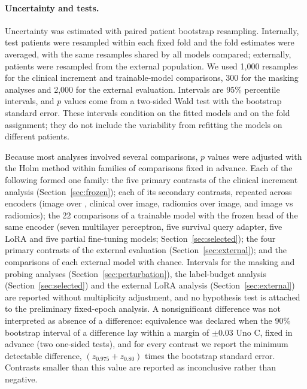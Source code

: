 \paragraph{Uncertainty and tests.} Uncertainty was estimated with paired patient bootstrap resampling. Internally, test patients were resampled within each fixed fold and the fold estimates were averaged, with the same resamples shared by all models compared; externally, patients were resampled from the external population. We used 1,000 resamples for the clinical increment and trainable-model comparisons, 300 for the masking analyses and 2,000 for the external evaluation. Intervals are 95\% percentile intervals, and $p$ values come from a two-sided Wald test with the bootstrap standard error. These intervals condition on the fitted models and on the fold assignment; they do not include the variability from refitting the models on different patients.

Because most analyses involved several comparisons, $p$ values were adjusted with the Holm method within families of comparisons fixed in advance. Each of the following formed one family: the five primary contrasts of the clinical increment analysis (Section~\ref{sec:frozen}); each of its secondary contrasts, repeated across encoders (image over , clinical over image, radiomics over image, and image vs radiomics); the 22 comparisons of a trainable model with the frozen head of the same encoder (seven multilayer perceptron, five survival query adapter, five LoRA and five partial fine-tuning models; Section~\ref{sec:selected}); the four primary contrasts of the external evaluation (Section~\ref{sec:external}); and the comparisons of each external model with chance. Intervals for the masking and probing analyses (Section~\ref{sec:perturbation}), the label-budget analysis (Section~\ref{sec:selected}) and the external LoRA analysis (Section~\ref{sec:external}) are reported without multiplicity adjustment, and no hypothesis test is attached to the preliminary fixed-epoch analysis. A nonsignificant difference was not interpreted as absence of a difference: equivalence was declared when the 90\% bootstrap interval of a difference lay within a margin of $\pm0.03$ Uno C, fixed in advance (two one-sided tests), and for every contrast we report the minimum detectable difference, $(z_{0.975}+z_{0.80})$ times the bootstrap standard error. Contrasts smaller than this value are reported as inconclusive rather than negative.


